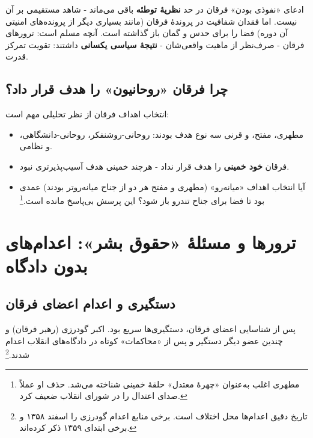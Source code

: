 \documentclass[12pt,a4paper]{book}
\newcommand{\keyword}[1]{\textbf{\textcolor{cPrimary}{#1}}}
\begin{document}
\begin{noteBox}
ادعای «نفوذی بودن» فرقان در حد \keyword{نظریهٔ توطئه} باقی می‌ماند - شاهد مستقیمی بر آن نیست. اما فقدان شفافیت در پروندهٔ فرقان (مانند بسیاری دیگر از پرونده‌های امنیتی آن دوره) فضا را برای حدس و گمان باز گذاشته است. آنچه مسلم است: ترورهای فرقان - صرف‌نظر از ماهیت واقعی‌شان - \keyword{نتیجهٔ سیاسی یکسانی} داشتند: تقویت تمرکز قدرت.
\end{noteBox}

\subsection{چرا فرقان «روحانیون» را هدف قرار داد؟}

انتخاب اهداف فرقان از نظر تحلیلی مهم است:

\begin{itemize}[label=\textcolor{cPrimary}{$\blacktriangleright$}, rightmargin=2em]
    \item مطهری، مفتح، و قرنی سه نوع هدف بودند: روحانی-روشنفکر، روحانی-دانشگاهی، و نظامی.
    \item فرقان \keyword{خود خمینی} را هدف قرار نداد - هرچند خمینی هدف آسیب‌پذیرتری نبود.
    \item آیا انتخاب اهداف «میانه‌رو» (مطهری و مفتح هر دو از جناح میانه‌روتر بودند) عمدی بود تا فضا برای جناح تندرو باز شود؟ این پرسش بی‌پاسخ مانده است.\footnote{مطهری اغلب به‌عنوان «چهرهٔ معتدل» حلقهٔ خمینی شناخته می‌شد. حذف او عملاً صدای اعتدال را در شورای انقلاب ضعیف کرد.}
\end{itemize}

\section{ترورها و مسئلهٔ «حقوق بشر»: اعدام‌های بدون دادگاه}

\subsection{دستگیری و اعدام اعضای فرقان}

پس از شناسایی اعضای فرقان، دستگیری‌ها سریع بود. اکبر گودرزی (رهبر فرقان) و چندین عضو دیگر دستگیر و پس از «محاکمات» کوتاه در دادگاه‌های انقلاب اعدام شدند.\footnote{تاریخ دقیق اعدام‌ها محل اختلاف است. برخی منابع اعدام گودرزی را اسفند ۱۳۵۸ و برخی ابتدای ۱۳۵۹ ذکر کرده‌اند.}
\end{document}

